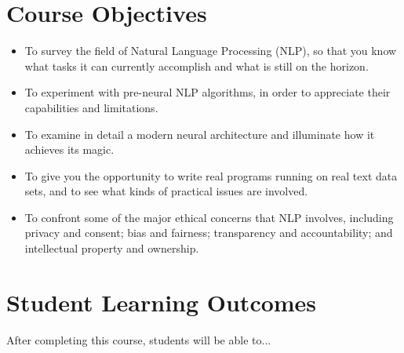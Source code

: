 \documentclass[12pt]{article}
\begin{document}
\section*{Course Objectives}

\begin{itemize}
\small

\item To survey the field of Natural Language Processing (NLP), so that you
know what tasks it can currently accomplish and what is still on the horizon.

\item To experiment with pre-neural NLP algorithms, in order to appreciate
their capabilities and limitations.

\item To examine in detail a modern neural architecture and illuminate how it
achieves its magic.

\item To give you the opportunity to write real programs running on real text
data sets, and to see what kinds of practical issues are involved.

\item To confront some of the major ethical concerns that NLP involves,
including privacy and consent; bias and fairness; transparency and
accountability; and intellectual property and ownership.

\end{itemize}

\section*{Student Learning Outcomes}

After completing this course, students will be able to...
\end{document}
